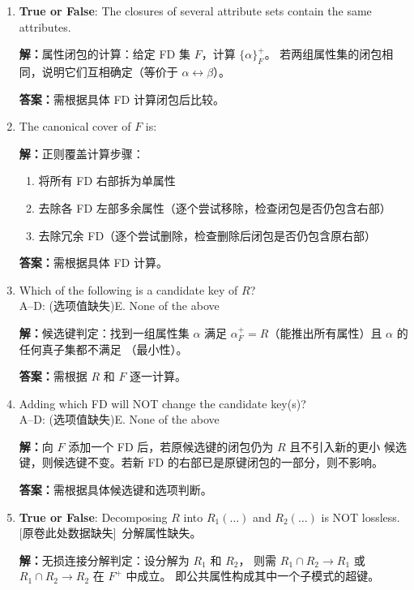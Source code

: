\documentclass[11pt,a4paper]{article}
\newcommand{\solution}{\par\noindent\textcolor{ansblue}{\textbf{解：}}}
\newcommand{\answer}{\par\noindent\textcolor{ansred}{\textbf{答案：}}}
\newcommand{\missingnote}{\textcolor{ansred}{[原卷此处数据缺失]}}
\begin{document}
\begin{enumerate}[leftmargin=*,itemsep=6pt]

\item \textbf{True or False}: The closures of several attribute sets contain
  the same attributes.

  \solution 属性闭包的计算：给定 FD 集 $F$，计算 $\{\alpha\}^+_F$。
  若两组属性集的闭包相同，说明它们互相确定（等价于 $\alpha \leftrightarrow \beta$）。

  \answer 需根据具体 FD 计算闭包后比较。

\item The canonical cover of $F$ is: \underline{\hspace{3cm}}

  \solution 正则覆盖计算步骤：
  \begin{enumerate}[nosep]
    \item 将所有 FD 右部拆为单属性
    \item 去除各 FD 左部多余属性（逐个尝试移除，检查闭包是否仍包含右部）
    \item 去除冗余 FD（逐个尝试删除，检查删除后闭包是否仍包含原右部）
  \end{enumerate}

  \answer 需根据具体 FD 计算。

\item Which of the following is a candidate key of $R$?\\
  A--D: (选项值缺失)\quad E. None of the above

  \solution 候选键判定：找到一组属性集 $\alpha$ 满足
  $\alpha^+_F = R$（能推出所有属性）且 $\alpha$ 的任何真子集都不满足
  （最小性）。

  \answer 需根据 $R$ 和 $F$ 逐一计算。

\item Adding which FD will NOT change the candidate key(s)?\\
  A--D: (选项值缺失)\quad E. None of the above

  \solution 向 $F$ 添加一个 FD 后，若原候选键的闭包仍为 $R$ 且不引入新的更小
  候选键，则候选键不变。若新 FD 的右部已是原键闭包的一部分，则不影响。

  \answer 需根据具体候选键和选项判断。

\item \textbf{True or False}: Decomposing $R$ into $R_1(\dots)$ and $R_2(\dots)$
  is NOT lossless. \missingnote\  分解属性缺失。

  \solution 无损连接分解判定：设分解为 $R_1$ 和 $R_2$，
  则需 $R_1 \cap R_2 \to R_1$ 或 $R_1 \cap R_2 \to R_2$ 在 $F^+$ 中成立。
  即公共属性构成其中一个子模式的超键。


\end{enumerate}
\end{document}
